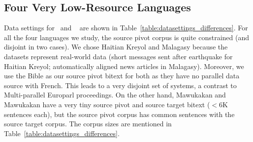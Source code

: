 \documentclass[11pt]{article}
\begin{document}
\subsection{Four Very Low-Resource Languages}
	Data settings for~\cite{Utiyama:07} and ~\cite{Cohn:07} are shown in Table~\ref{table:datasettings_differences}. For all the four languages we study, the source pivot corpus is quite constrained (and disjoint in two cases). We chose Haitian Kreyol and Malagasy because the datasets represent real-world data (short messages sent after earthquake for Haitian Kreyol; automatically aligned news articles in Malagasy). Moreover, we use the Bible as our source pivot bitext for both as they have no parallel data source with French. This leads to a very disjoint set of systems, a contrast to Multi-parallel Europarl proceedings. On the other hand, Mawukakan and Mawukakan have a very tiny source pivot and source target bitext ($<$6K sentences each), but the source pivot corpus has common sentences with the source target corpus. The corpus sizes are mentioned in Table~\ref{table:datasettings_differences}. 
\end{document}
